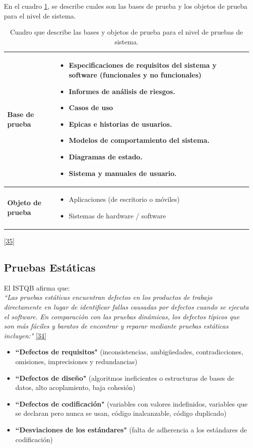  	En el cuadro \ref{tbl:basesyobjetos},  se describe cuales son las bases de prueba y los objetos de prueba para el nivel de sistema.
 

\begin{table}[H]
	\centering
	\begin{tabular}{|p{3.5cm}|p{13cm}|}
		\hline
		\centering \textbf{Base de prueba} & \begin{itemize}
			\item Especificaciones de requisitos del sistema y software (funcionales y no funcionales)
			\item Informes de análisis de riesgos.
			\item Casos de uso
			\item Epicas e historias de usuarios.
			\item Modelos de comportamiento del sistema.
			\item Diagramas de estado.
			\item Sistema y manuales de usuario.
		\end{itemize}
		  \\
		\hline
		\centering \textbf{Objeto de prueba} & \begin{itemize}
			\item Aplicaciones (de escritorio o móviles)
			\item Sistemas de hardware / software
		\end{itemize}  \\
		\hline
	\end{tabular}
\caption{Cuadro que describe las bases y objetos de prueba para el nivel de pruebas de sistema.}
\label{tbl:basesyobjetos}
\hyperlink{b35}{[35]}
\end{table}


\subsection{Pruebas Estáticas}

El ISTQB afirma que:\\

\textit {``Las pruebas estáticas encuentran defectos en los productos de trabajo directamente en lugar de identificar fallas causadas por defectos cuando se ejecuta el software.  En comparación con las pruebas dinámicas, los defectos típicos que son más fáciles y baratos de encontrar y reparar mediante pruebas estáticas incluyen:"} \hyperlink{b34}{[34]}
\begin{itemize}
	\item \textbf {``Defectos de requisitos"} (inconsistencias, ambigüedades, contradicciones, omisiones, imprecisiones y redundancias)
	\item \textbf {``Defectos de diseño"} (algoritmos ineficientes o estructuras de bases de datos, alto acoplamiento, baja cohesión)
	\item \textbf {``Defectos de codificación"} (variables con valores indefinidos, variables que se declaran pero nunca se usan, código inalcanzable, código duplicado)
	\item \textbf {``Desviaciones de los estándares"} (falta de adherencia a los estándares de codificación)
\end{itemize}

